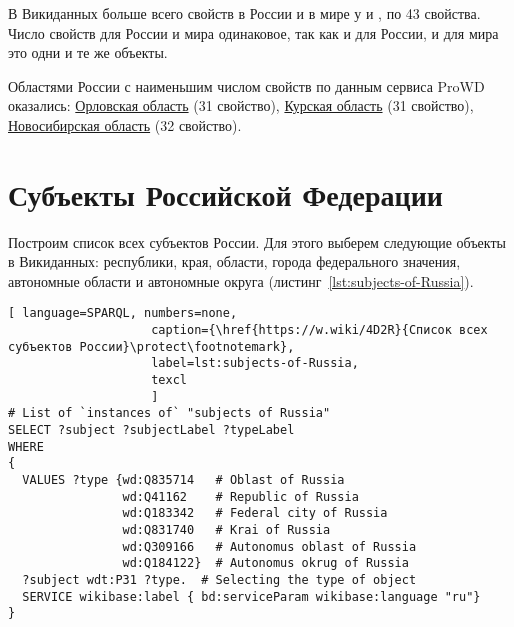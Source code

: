 В Викиданных больше всего свойств в России и в мире у  и , по 43 свойства\autocite{Russia_prowd}. Число свойств для России и мира одинаковое, так как и для России, и для мира это одни и те же объекты.

Областями России с наименьшим числом свойств по данным сервиса ProWD оказались: \href{http://www.wikidata.org/entity/Q3129}{Орловская область} (31 свойство), \href{http://www.wikidata.org/entity/Q3178}{Курская область} (31 свойство), \href{http://www.wikidata.org/entity/Q5851}{Новосибирская область} (32 свойство).


\section{Субъекты Российской Федерации}

Построим список всех субъектов России. Для этого выберем следующие объекты в Викиданных: республики, края, области, города федерального значения, автономные области и автономные округа (листинг~\ref{lst:subjects-of-Russia}).


\begin{lstlisting}[ language=SPARQL, numbers=none,
                    caption={\href{https://w.wiki/4D2R}{Список всех субъектов России}\protect\footnotemark},
                    label=lst:subjects-of-Russia,
                    texcl 
                    ]
# List of `instances of` "subjects of Russia" 
SELECT ?subject ?subjectLabel ?typeLabel
WHERE
{  
  VALUES ?type {wd:Q835714   # Oblast of Russia
                wd:Q41162    # Republic of Russia
                wd:Q183342   # Federal city of Russia
                wd:Q831740   # Krai of Russia
                wd:Q309166   # Autonomus oblast of Russia
                wd:Q184122}  # Autonomus okrug of Russia
  ?subject wdt:P31 ?type.  # Selecting the type of object
  SERVICE wikibase:label { bd:serviceParam wikibase:language "ru"}
}
\end{lstlisting}%

